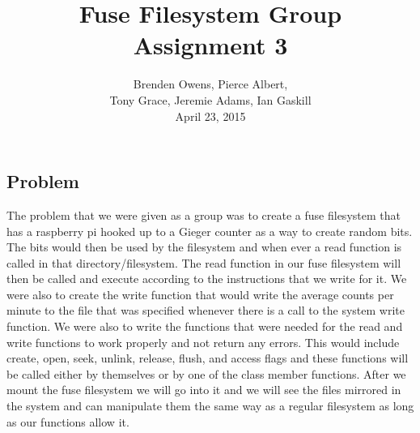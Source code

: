 \documentclass{paper}
\begin{document}
\title{Fuse Filesystem Group\\ Assignment 3}
\author{Brenden Owens, Pierce Albert, \\
Tony Grace, Jeremie Adams, Ian Gaskill
\\April 23, 2015}

\maketitle

\begin{doublespace}
\section{Problem}
The problem that we were given as a group was to create a fuse filesystem that has a raspberry pi hooked up to a Gieger counter as a way to create random bits. The bits would then be used by the filesystem and when ever a read function is called in that directory/filesystem. The read function in our fuse filesystem will then be called and execute according to the instructions that we write for it. 
We were also to create the write function that would write the average counts per minute to the file that was specified whenever there is a call to the system write function. We were also to write the functions that were needed for the read and write functions to work properly and not return any errors. This would include create, open, seek, unlink, release, flush, and access flags and these functions 
will be called either by themselves or by one of the class member functions. After we mount the fuse filesystem we will go into it and we will see the files mirrored in the system and can manipulate them the same way as a regular filesystem as long as our functions allow it. 


\end{doublespace}
\end{document}
